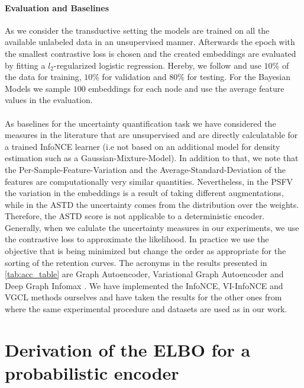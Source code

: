 \documentclass[tablecaption=bottom,wcp]{jmlr} %
\begin{document}
\newpage
\paragraph{Evaluation and Baselines}
As we consider the transductive setting the models are trained on all the available unlabeled data in an unsupervised manner. Afterwards the epoch with the smallest contrastive loss is chosen and the created embeddings are evaluated by fitting a $l_{2}$-regularized logistic regression. Hereby, we follow \citet{liu2021} and use $10\%$ of the data for training,  $10\%$ for validation and $80\%$ for testing. For the Bayesian Models we sample $100$ embeddings for each node and use the average feature values in the evaluation. \\\\
As baselines for the uncertainty quantification task we have considered the measures in the literature that are unsupervised and are directly calculatable for a trained InfoNCE learner (i.e not based on an additional model for density estimation such as a Gaussian-Mixture-Model). In addition to that, we note that the Per-Sample-Feature-Variation \citep[PSFV,][]{ardeshir2022uncertainty} and the Average-Standard-Deviation of the features \citep[ASTD,][]{BGCL} are computationally very similar quantities. Nevertheless, in the PSFV the variation in the embeddings is a result of taking different augmentations, while in the ASTD the uncertainty comes from the distribution over the weights. Therefore, the ASTD score is not applicable to a deterministic encoder. Generally, when we calulate the uncertainty measures in our experiments, we use the contrastive loss to approximate the likelihood. In practice we use the objective that is being minimized but change the order as appropriate for the sorting of the retention curves. The acronyms in the results presented in \cref{tab:acc_table} are Graph Autoencoder, Variational Graph Autoencoder \citep[GAE,VGAE,][]{kipf2016semi} and Deep Graph Infomax \citep[DGI,][]{veličković2018deep}. We have implemented the InfoNCE, VI-InfoNCE and VGCL methods ourselves and have taken the results for the other ones from \citet{Grace} where the same experimental procedure and datasets are used as in our work.


\newpage
\section{Derivation of the ELBO for a probabilistic encoder}\label{apd:der elbo}
\end{document}
